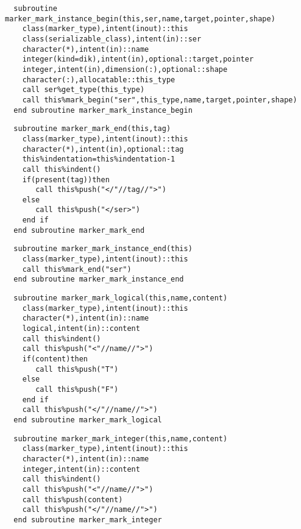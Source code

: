 \begin{Verbatim}
  subroutine marker_mark_instance_begin(this,ser,name,target,pointer,shape)
    class(marker_type),intent(inout)::this
    class(serializable_class),intent(in)::ser
    character(*),intent(in)::name
    integer(kind=dik),intent(in),optional::target,pointer
    integer,intent(in),dimension(:),optional::shape
    character(:),allocatable::this_type
    call ser%get_type(this_type)
    call this%mark_begin("ser",this_type,name,target,pointer,shape)
  end subroutine marker_mark_instance_begin
\end{Verbatim}

\begin{Verbatim}
  subroutine marker_mark_end(this,tag)
    class(marker_type),intent(inout)::this
    character(*),intent(in),optional::tag
    this%indentation=this%indentation-1
    call this%indent()
    if(present(tag))then
       call this%push("</"//tag//">")
    else
       call this%push("</ser>")
    end if
  end subroutine marker_mark_end
\end{Verbatim}

\begin{Verbatim}
  subroutine marker_mark_instance_end(this)
    class(marker_type),intent(inout)::this
    call this%mark_end("ser")
  end subroutine marker_mark_instance_end
\end{Verbatim}

\begin{Verbatim}
  subroutine marker_mark_logical(this,name,content)
    class(marker_type),intent(inout)::this
    character(*),intent(in)::name
    logical,intent(in)::content
    call this%indent()
    call this%push("<"//name//">")
    if(content)then
       call this%push("T")
    else
       call this%push("F")
    end if
    call this%push("</"//name//">")
  end subroutine marker_mark_logical
\end{Verbatim}

\begin{Verbatim}
  subroutine marker_mark_integer(this,name,content)
    class(marker_type),intent(inout)::this
    character(*),intent(in)::name
    integer,intent(in)::content
    call this%indent()
    call this%push("<"//name//">")
    call this%push(content)
    call this%push("</"//name//">")
  end subroutine marker_mark_integer
\end{Verbatim}

